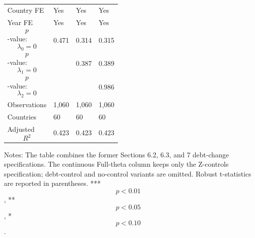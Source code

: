 \begin{table}[H]
\begin{threeparttable}
\begin{tabularx}{\textwidth}{lYYY}
Country FE & Yes & Yes & Yes \\
Year FE & Yes & Yes & Yes \\
$$p$$-value: $$\lambda_0=0$$ & 0.471 & 0.314 & 0.315 \\
$$p$$-value: $$\lambda_1=0$$ &  & 0.387 & 0.389 \\
$$p$$-value: $$\lambda_2=0$$ &  &  & 0.986 \\
Observations & 1,060 & 1,060 & 1,060 \\
Countries & 60 & 60 & 60 \\
Adjusted $$R^2$$ & 0.423 & 0.423 & 0.423 \\
\bottomrule
\end{tabularx}
\begin{tablenotes}[flushleft]\footnotesize
\item Notes: The table combines the former Sections 6.2, 6.3, and 7 debt-change specifications. The continuous Full-theta column keeps only the Z-controls specification; debt-control and no-control variants are omitted. Robust t-statistics are reported in parentheses. *** $$p<0.01$$, ** $$p<0.05$$, * $$p<0.10$$.
\end{tablenotes}
\end{threeparttable}
\end{table}
